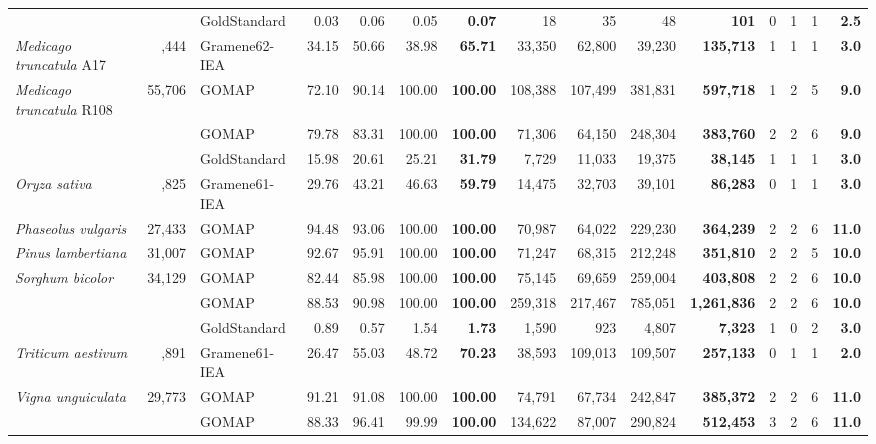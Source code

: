 \documentclass[utf8]{frontiersSCNS}
\begin{document}
\begin{table}[t]
{\begin{threeparttable}
\begin{tabular}{lrlrrr>{\bfseries}r|rrr>{\bfseries}r|rrr>{\bfseries}r}
\rowcolor{gray!6}   &  & GoldStandard & 0.03 & 0.06 & 0.05 & 0.07 & 18 & 35 & 48 & 101 & 0 & 1 & 1 & 2.5\\

\multirow{-3}{*}{\raggedright\arraybackslash \textit{Medicago truncatula} A17} & \multirow{-3}{*}{\raggedleft\arraybackslash 50,444} & Gramene62-IEA & 34.15 & 50.66 & 38.98 & 65.71 & 33,350 & 62,800 & 39,230 & 135,713 & 1 & 1 & 1 & 3.0\\
\cmidrule{1-15}
\rowcolor{gray!6}  \textit{Medicago truncatula} R108 & 55,706 & GOMAP & 72.10 & 90.14 & 100.00 & 100.00 & 108,388 & 107,499 & 381,831 & 597,718 & 1 & 2 & 5 & 9.0\\
\cmidrule{1-15}
 &  & GOMAP & 79.78 & 83.31 & 100.00 & 100.00 & 71,306 & 64,150 & 248,304 & 383,760 & 2 & 2 & 6 & 9.0\\

\rowcolor{gray!6}   &  & GoldStandard & 15.98 & 20.61 & 25.21 & 31.79 & 7,729 & 11,033 & 19,375 & 38,145 & 1 & 1 & 1 & 3.0\\

\multirow{-3}{*}{\raggedright\arraybackslash \textit{Oryza sativa}} & \multirow{-3}{*}{\raggedleft\arraybackslash 35,825} & Gramene61-IEA & 29.76 & 43.21 & 46.63 & 59.79 & 14,475 & 32,703 & 39,101 & 86,283 & 0 & 1 & 1 & 3.0\\
\cmidrule{1-15}
\rowcolor{gray!6}  \textit{Phaseolus vulgaris} & 27,433 & GOMAP & 94.48 & 93.06 & 100.00 & 100.00 & 70,987 & 64,022 & 229,230 & 364,239 & 2 & 2 & 6 & 11.0\\
\cmidrule{1-15}
\textit{Pinus lambertiana} & 31,007 & GOMAP & 92.67 & 95.91 & 100.00 & 100.00 & 71,247 & 68,315 & 212,248 & 351,810 & 2 & 2 & 5 & 10.0\\
\cmidrule{1-15}
\rowcolor{gray!6}  \textit{Sorghum bicolor} & 34,129 & GOMAP & 82.44 & 85.98 & 100.00 & 100.00 & 75,145 & 69,659 & 259,004 & 403,808 & 2 & 2 & 6 & 10.0\\
\cmidrule{1-15}
 &  & GOMAP & 88.53 & 90.98 & 100.00 & 100.00 & 259,318 & 217,467 & 785,051 & 1,261,836 & 2 & 2 & 6 & 10.0\\

\rowcolor{gray!6}   &  & GoldStandard & 0.89 & 0.57 & 1.54 & 1.73 & 1,590 & 923 & 4,807 & 7,323 & 1 & 0 & 2 & 3.0\\

\multirow{-3}{*}{\raggedright\arraybackslash \textit{Triticum aestivum}} & \multirow{-3}{*}{\raggedleft\arraybackslash 107,891} & Gramene61-IEA & 26.47 & 55.03 & 48.72 & 70.23 & 38,593 & 109,013 & 109,507 & 257,133 & 0 & 1 & 1 & 2.0\\
\cmidrule{1-15}
\rowcolor{gray!6}  \textit{Vigna unguiculata} & 29,773 & GOMAP & 91.21 & 91.08 & 100.00 & 100.00 & 74,791 & 67,734 & 242,847 & 385,372 & 2 & 2 & 6 & 11.0\\
\cmidrule{1-15}
 &  & GOMAP & 88.33 & 96.41 & 99.99 & 100.00 & 134,622 & 87,007 & 290,824 & 512,453 & 3 & 2 & 6 & 11.0\\


\end{tabular}
\end{threeparttable}}
\end{table}
\end{document}
